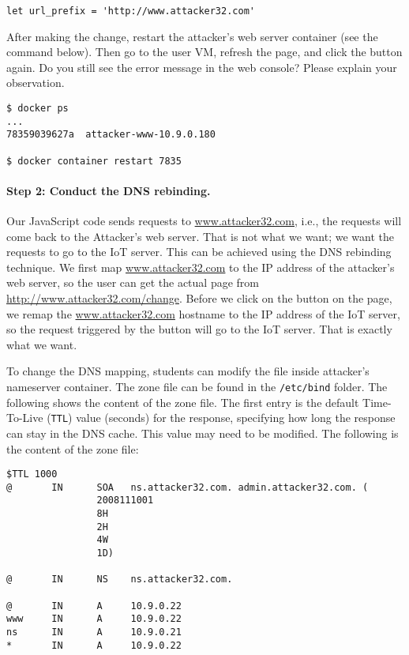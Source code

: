 \begin{lstlisting}
let url_prefix = 'http://www.attacker32.com'
\end{lstlisting}
 

After making the change, restart the attacker's web server container (see the 
command below). Then go to the user VM, refresh the page, and click the button again. 
Do you still see the error
message in the web console? Please explain your observation. 


\begin{lstlisting}
$ docker ps
...
78359039627a  attacker-www-10.9.0.180

$ docker container restart 7835
\end{lstlisting}
 


\paragraph{Step 2: Conduct the DNS rebinding.}
Our JavaScript code sends requests to \url{www.attacker32.com}, 
i.e., the requests will come back to the Attacker's web server. That is not 
what we want; we want the requests to go to the IoT server. 
This can be achieved using the DNS rebinding 
technique. We first map \url{www.attacker32.com} to the IP address of the attacker's
web server, so
the user can get the actual page from \url{http://www.attacker32.com/change}. 
Before we click on the button on the page, we remap
the \url{www.attacker32.com} hostname to the IP address of the IoT server, so
the request triggered by the button will go to the IoT server. That is exactly what 
we want. 


To change the DNS mapping, students can modify the 
 file inside attacker's nameserver container.
The zone file can be found in 
the \texttt{/etc/bind} folder. 
The following shows the content of the zone file. The first 
entry is the default Time-To-Live (\texttt{TTL}) value (seconds) 
for the response, specifying how long the response can stay in
the DNS cache. This value may need to be modified. 
The following is the content of the zone file:

\begin{lstlisting}
$TTL 1000
@       IN      SOA   ns.attacker32.com. admin.attacker32.com. (
                2008111001
                8H
                2H
                4W
                1D)

@       IN      NS    ns.attacker32.com.

@       IN      A     10.9.0.22
www     IN      A     10.9.0.22
ns      IN      A     10.9.0.21
*       IN      A     10.9.0.22
\end{lstlisting}


